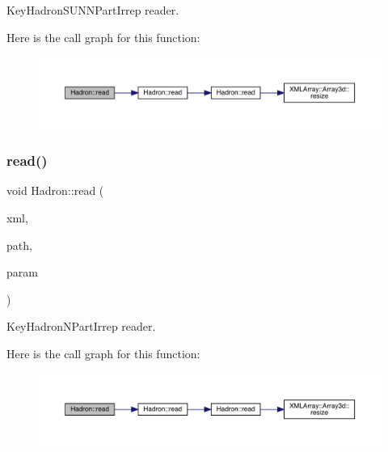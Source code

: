 Key\+Hadron\+S\+U\+N\+N\+Part\+Irrep reader. 

Here is the call graph for this function\+:\nopagebreak
\begin{figure}[H]
\begin{center}
\leavevmode
\includegraphics[width=350pt]{d1/daf/namespaceHadron_a6ee3d9a9ffb4f6e626fa1a73b49c9ee0_cgraph}
\end{center}
\end{figure}
\mbox{\label{namespaceHadron_ac345c2bc828c82e6774e6bc01e57535e}} 
\subsubsection{\texorpdfstring{read()}{read()}\hspace{0.1cm}{\footnotesize\ttfamily [72/94]}}
{\footnotesize\ttfamily void Hadron\+::read (\begin{DoxyParamCaption}\item[{\mbox{\hyperlink{classADATXML_1_1XMLReader}{X\+M\+L\+Reader}} \&}]{xml,  }\item[{const std\+::string \&}]{path,  }\item[{\mbox{\hyperlink{structHadron_1_1KeyHadronNPartIrrepOp__t}{Key\+Hadron\+N\+Part\+Irrep\+Op\+\_\+t}} \&}]{param }\end{DoxyParamCaption})}



Key\+Hadron\+N\+Part\+Irrep reader. 

Here is the call graph for this function\+:\nopagebreak
\begin{figure}[H]
\begin{center}
\leavevmode
\includegraphics[width=350pt]{d1/daf/namespaceHadron_ac345c2bc828c82e6774e6bc01e57535e_cgraph}
\end{center}
\end{figure}
\mbox{\label{namespaceHadron_a0dee7d09d7d8dd3947cd5a0c3c4c0447}} 
